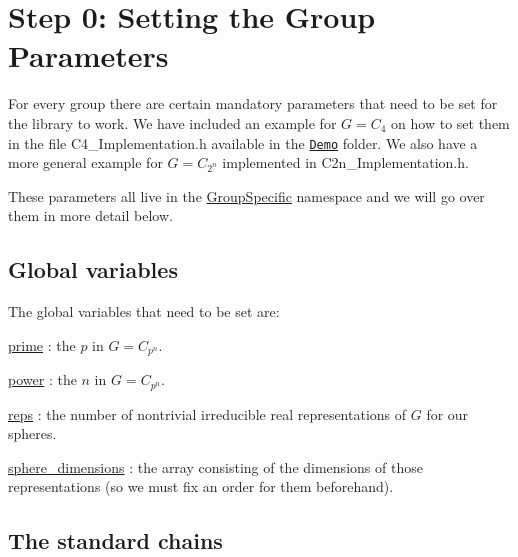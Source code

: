 \hypertarget{use_how}{}\section{Step 0\+: Setting the Group Parameters}\label{use_how}
For every group there are certain mandatory parameters that need to be set for the library to work. We have included an example for $G=C_4$ on how to set them in the file {\ttfamily C4\+\_\+\+Implementation.\+h} available in the \href{https://github.com/NickG-Math/Mackey/tree/master/Demo}{\tt Demo} folder. We also have a more general example for $G=C_{2^n}$ implemented in {\ttfamily C2n\+\_\+\+Implementation.\+h}.

These parameters all live in the \hyperlink{namespaceGroupSpecific}{Group\+Specific} namespace and we will go over them in more detail below.\hypertarget{use_var}{}\subsection{Global variables}\label{use_var}
The global variables that need to be set are\+:


\begin{DoxyItemize}
\item \hyperlink{classGroupSpecific_1_1Variables_a38586ec998bcbfdf325e6cfc6598b54b}{prime} \+: the $p$ in $G=C_{p^n}$.
\item \hyperlink{classGroupSpecific_1_1Variables_ac9bd6be19cc41e6877ee25a2d1c7be80}{power} \+: the $n$ in $G=C_{p^n}$.
\item \hyperlink{classGroupSpecific_1_1Variables_a5504789b0b60050e6ea223fdeb84874a}{reps} \+: the number of nontrivial irreducible real representations of $G$ for our spheres.
\item \hyperlink{classGroupSpecific_1_1Variables_a4746f16736abcf4c705dd8690ec12ca0}{sphere\+\_\+dimensions} \+: the array consisting of the dimensions of those representations (so we must fix an order for them beforehand).
\end{DoxyItemize}\hypertarget{use_fun}{}\subsection{The standard chains}\label{use_fun}

